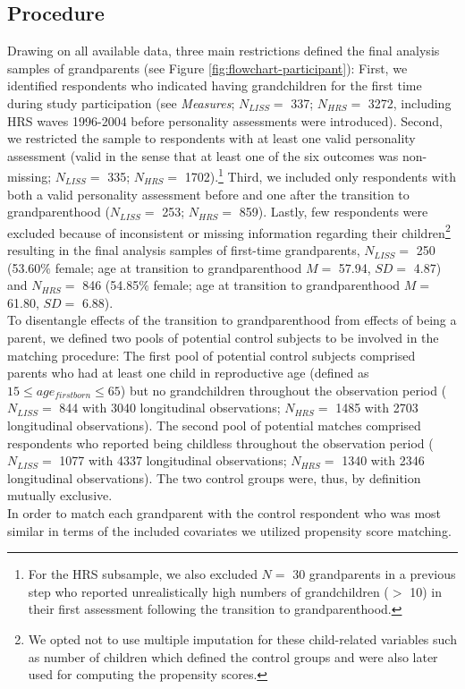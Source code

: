\documentclass[
  english,
  man, noextraspace]{apa7}
\begin{document}
\hypertarget{procedure}{%
\subsection{Procedure}\label{procedure}}

Drawing on all available data, three main restrictions defined the final analysis samples of grandparents (see Figure \ref{fig:flowchart-participant}): First, we identified respondents who indicated having grandchildren for the first time during study participation (see \emph{Measures}; \(N_{LISS} =\) 337; \(N_{HRS} =\) 3272, including HRS waves 1996-2004 before personality assessments were introduced). Second, we restricted the sample to respondents with at least one valid personality assessment (valid in the sense that at least one of the six outcomes was non-missing; \(N_{LISS} =\) 335; \(N_{HRS} =\) 1702).\footnote{For the HRS subsample, we also excluded \(N =\) 30 grandparents in a previous step who reported unrealistically high numbers of grandchildren (\(>\) 10) in their first assessment following the transition to grandparenthood.} Third, we included only respondents with both a valid personality assessment before and one after the transition to grandparenthood (\(N_{LISS} =\) 253; \(N_{HRS} =\) 859). Lastly, few respondents were excluded because of inconsistent or missing information regarding their children\footnote{We opted not to use multiple imputation for these child-related variables such as number of children which defined the control groups and were also later used for computing the propensity scores.} resulting in the final analysis samples of first-time grandparents, \(N_{LISS} =\) 250 (53.60\(\%\) female; age at transition to grandparenthood \(M =\) 57.94, \(SD =\) 4.87) and \(N_{HRS} =\) 846 (54.85\(\%\) female; age at transition to grandparenthood \(M =\) 61.80, \(SD =\) 6.88).\\
To disentangle effects of the transition to grandparenthood from effects of being a parent, we defined two pools of potential control subjects to be involved in the matching procedure: The first pool of potential control subjects comprised parents who had at least one child in reproductive age (defined as \(15 \leq age_{firstborn}\leq65\)) but no grandchildren throughout the observation period (\(N_{LISS} =\) 844 with 3040 longitudinal observations; \(N_{HRS} =\) 1485 with 2703 longitudinal observations). The second pool of potential matches comprised respondents who reported being childless throughout the observation period (\(N_{LISS} =\) 1077 with 4337 longitudinal observations; \(N_{HRS} =\) 1340 with 2346 longitudinal observations). The two control groups were, thus, by definition mutually exclusive.\\
In order to match each grandparent with the control respondent who was most similar in terms of the included covariates we utilized propensity score matching.
\end{document}
